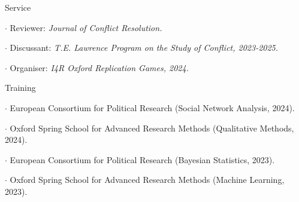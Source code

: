 \documentclass[10pt]{resume} %
\begin{document}
	\begin{rSection}{Service} \itemsep -5pt
	  \item $\cdot$ Reviewer: \textit{Journal of Conflict Resolution.}
		\item $\cdot$ Discussant: \textit{T.E. Lawrence Program on the Study of Conflict, 2023-2025.}
		\item $\cdot$ Organiser: \textit{I4R Oxford Replication Games, 2024.}
	\end{rSection}

	\begin{rSection}{Training} \itemsep -5pt
		
		\item $\cdot$ European Consortium for Political Research (Social Network Analysis, 2024).
    
    \item $\cdot$ Oxford Spring School for Advanced Research Methods (Qualitative Methods, 2024).
		
		\item $\cdot$ European Consortium for Political Research (Bayesian Statistics, 2023).
		
		\item $\cdot$ Oxford Spring School for Advanced Research Methods (Machine Learning, 2023).
	
	\end{rSection}
\end{document}
